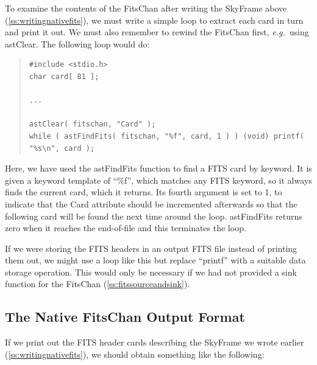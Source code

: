 \documentclass[twoside,11pt]{article}
\newcommand{\htmlref}[2]{#1}
\newcommand{\secref}[1]{\S\ref{#1}}
\renewcommand{\secref}[1]{\ref{#1}}
\begin{document}
To examine the contents of the \htmlref{FitsChan}{FitsChan} after writing the \htmlref{SkyFrame}{SkyFrame}
above (\secref{ss:writingnativefits}), we must write a simple loop to
extract each card in turn and print it out. We must also remember to
rewind the FitsChan first, {\em{e.g.}}\ using \htmlref{astClear}{astClear}. The following
loop would do:

\begin{quote}
\small
\begin{verbatim}
#include <stdio.h>
char card[ 81 ];

...

astClear( fitschan, "Card" );
while ( astFindFits( fitschan, "%f", card, 1 ) ) (void) printf( "%s\n", card );
\end{verbatim}
\normalsize
\end{quote}

Here, we have used the \htmlref{astFindFits}{astFindFits} function to find a FITS card by
keyword. It is given a keyword template of ``\%f'', which matches any
FITS keyword, so it always finds the current card, which it
returns. Its fourth argument is set to 1, to indicate that the \htmlref{Card}{Card}
attribute should be incremented afterwards so that the following card
will be found the next time around the loop. astFindFits returns zero
when it reaches the end-of-file and this terminates the loop.

If we were storing the FITS headers in an output FITS file instead of
printing them out, we might use a loop like this but replace
``printf'' with a suitable data storage operation. This would only be
necessary if we had not provided a sink function for the FitsChan
(\secref{ss:fitssourceandsink}).

\subsection{The Native FitsChan Output Format}

If we print out the FITS header cards describing the \htmlref{SkyFrame}{SkyFrame} we wrote
earlier (\secref{ss:writingnativefits}), we should obtain something
like the following:
\end{document}
